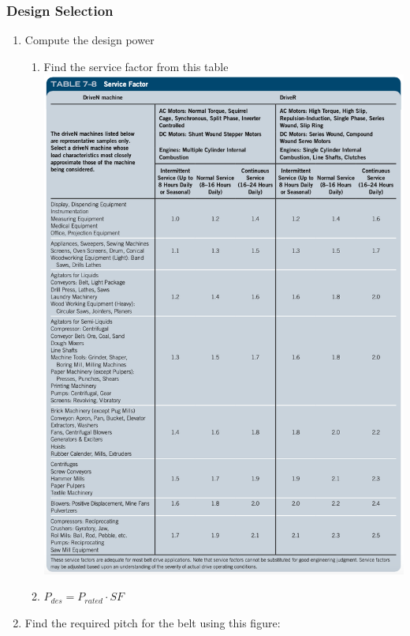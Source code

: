 \documentclass[11pt, fleqn]{article}
\begin{document}
\subsubsection{Design Selection}
\begin{enumerate}
    \item Compute the design power\\
    \begin{enumerate}
        \item Find the service factor from this table\\
        \includegraphics[scale=0.8]{Belts/7-8.png}
        \item $P_{des}=P_{rated}\cdot SF$
    \end{enumerate}
    \item Find the required pitch for the belt using this figure:\\

\end{enumerate}
\end{document}
